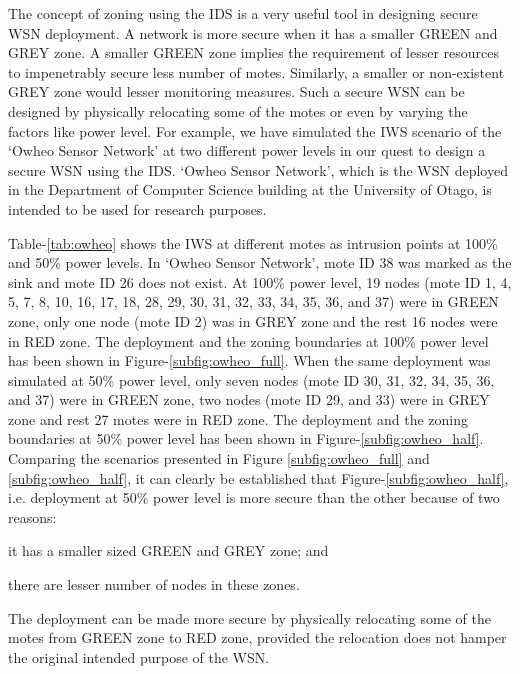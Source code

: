 \documentclass[conference,final]{IEEEtran}
\begin{document}
The concept of zoning using the IDS is a very useful tool in designing secure WSN deployment.
A network is more secure when it has a smaller GREEN and GREY zone.
A smaller GREEN zone implies the requirement of lesser resources to impenetrably secure less number of motes.
Similarly, a smaller or non-existent GREY zone would lesser monitoring measures.
Such a secure WSN can be designed by physically relocating some of the motes or even by varying the factors like power level.
For example, we have simulated the IWS scenario of the `Owheo Sensor Network' at two different power levels in our quest to design a secure WSN using the IDS.
`Owheo Sensor Network', which is the WSN deployed in the Department of Computer Science building at the University of Otago, is intended to be used for research purposes.




Table-\ref{tab:owheo} shows the IWS at different motes as intrusion points at 100\% and 50\% power levels. 
In `Owheo Sensor Network', mote ID 38 was marked as the sink and mote ID 26 does not exist.
At 100\% power level, 19 nodes (mote ID 1, 4, 5, 7, 8, 10, 16, 17, 18, 28, 29, 30, 31, 32, 33, 34, 35, 36, and 37) were in GREEN zone, only one node (mote ID 2) was in GREY zone and the rest 16 nodes were in RED zone.
The deployment and the zoning boundaries at 100\% power level has been shown in Figure-\ref{subfig:owheo_full}.
When the same deployment was simulated at 50\% power level, only seven nodes (mote ID 30, 31, 32, 34, 35, 36, and 37) were in GREEN zone, two nodes (mote ID 29, and 33) were in GREY zone and rest 27 motes were in RED zone.
The deployment and the zoning boundaries at 50\% power level has been shown in Figure-\ref{subfig:owheo_half}.
Comparing the scenarios presented in  Figure \ref{subfig:owheo_full} and \ref{subfig:owheo_half}, it can clearly be established that Figure-\ref{subfig:owheo_half}, i.e. deployment at 50\% power level is more secure than the other because of two reasons:
\begin{inparaenum}
\item it has a smaller sized GREEN and GREY zone; and 
\item there are lesser number of nodes in these zones. 
\end{inparaenum}
The deployment can be made more secure by physically relocating some of the motes from GREEN zone to RED zone, provided the relocation does not hamper the original intended purpose of the WSN.
\end{document}
